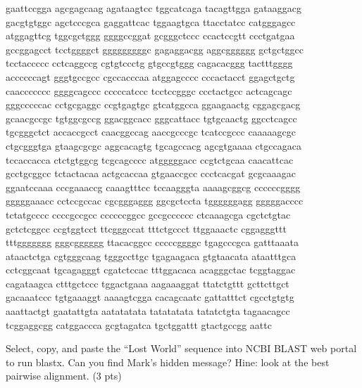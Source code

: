 \documentclass{article}
\begin{document}
gaattccgga agcgagcaag agataagtcc tggcatcaga tacagttgga gataaggacg\\
gacgtgtggc agctcccgca gaggattcac tggaagtgca ttacctatcc catgggagcc\\
atggagttcg tggcgctggg ggggccggat gcgggctccc ccactccgtt ccctgatgaa\\
gccggagcct tcctggggct gggggggggc gagaggacgg aggcgggggg gctgctggcc\\
tcctaccccc cctcaggccg cgtgtccctg gtgccgtggg cagacacggg tactttgggg\\
accccccagt gggtgccgcc cgccacccaa atggagcccc cccactacct ggagctgctg\\
caaccccccc ggggcagccc cccccatccc tcctccgggc ccctactgcc actcagcagc\\
gggcccccac cctgcgaggc ccgtgagtgc gtcatggcca ggaagaactg cggagcgacg\\
gcaacgccgc tgtggcgccg ggacggcacc gggcattacc tgtgcaactg ggcctcagcc\\
tgcgggctct accaccgcct caacggccag aaccgcccgc tcatccgccc caaaaagcgc\\
ctgcgggtga gtaagcgcgc aggcacagtg tgcagccacg agcgtgaaaa ctgccagaca\\
tccaccacca ctctgtggcg tcgcagcccc atgggggacc ccgtctgcaa caacattcac\\
gcctgcggcc tctactacaa actgcaccaa gtgaaccgcc ccctcacgat gcgcaaagac\\
ggaatccaaa cccgaaaccg caaagtttcc tccaagggta aaaagcggcg ccccccgggg\\
gggggaaacc cctccgccac cgcgggaggg ggcgctccta tggggggagg gggggacccc\\
tctatgcccc ccccgccgcc ccccccggcc gccgcccccc ctcaaagcga cgctctgtac\\
gctctcggcc ccgtggtcct ttcgggccat tttctgccct ttggaaactc cggagggttt\\
tttggggggg gggcgggggg ttacacggcc cccccggggc tgagcccgca gatttaaata\\
ataactctga cgtgggcaag tgggccttgc tgagaagaca gtgtaacata ataatttgca\\
cctcggcaat tgcagagggt cgatctccac tttggacaca acagggctac tcggtaggac\\
cagataagca ctttgctccc tggactgaaa aagaaaggat ttatctgttt gcttcttgct\\
gacaaatccc tgtgaaaggt aaaagtcgga cacagcaatc gattatttct cgcctgtgtg\\
aaattactgt gaatattgta aatatatata tatatatata tatatctgta tagaacagcc\\
tcggaggcgg catggaccca gcgtagatca tgctggattt gtactgccgg aattc

Select, copy, and paste the ``Lost World'' sequence into NCBI BLAST web portal to run blastx.
Can you find Mark's hidden message? Hine: look at the best pairwise alignment. (3 pts)
\end{document}
